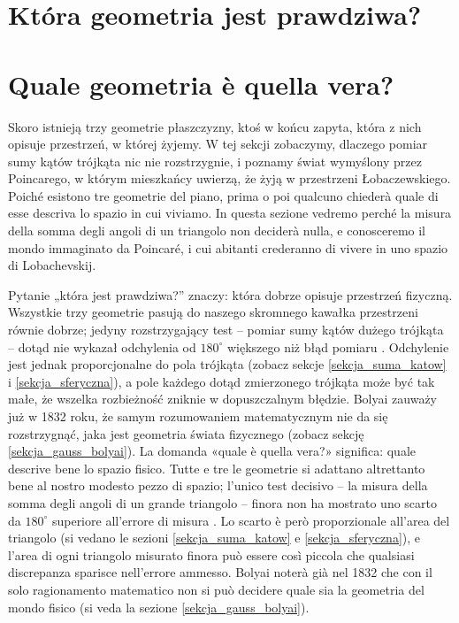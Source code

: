 
\section{Która geometria jest prawdziwa?} %
\section{Quale geometria è quella vera?} %
\label{sekcja_fizyka}

Skoro istnieją trzy geometrie płaszczyzny, ktoś w końcu zapyta, która z nich opisuje przestrzeń, w której żyjemy. %
W tej sekcji zobaczymy, dlaczego pomiar sumy kątów trójkąta nic nie rozstrzygnie, i poznamy świat wymyślony przez Poincarego, w którym mieszkańcy uwierzą, że żyją w przestrzeni Łobaczewskiego. %
Poiché esistono tre geometrie del piano, prima o poi qualcuno chiederà quale di esse descriva lo spazio in cui viviamo. %
In questa sezione vedremo perché la misura della somma degli angoli di un triangolo non deciderà nulla, e conosceremo il mondo immaginato da Poincaré, i cui abitanti crederanno di vivere in uno spazio di Lobachevskij. %

Pytanie „która jest prawdziwa?'' znaczy: która dobrze opisuje przestrzeń fizyczną. %
Wszystkie trzy geometrie pasują do naszego skromnego kawałka przestrzeni równie dobrze; jedyny rozstrzygający test -- pomiar sumy kątów dużego trójkąta -- dotąd nie wykazał odchylenia od $180^\circ$ większego niż błąd pomiaru \cite[s. 315]{eves1_1972}. %
Odchylenie jest jednak proporcjonalne do pola trójkąta (zobacz sekcje \ref{sekcja_suma_katow} i \ref{sekcja_sferyczna}), a pole każdego dotąd zmierzonego trójkąta może być tak małe, że wszelka rozbieżność zniknie w dopuszczalnym błędzie. %
Bolyai zauważy już w 1832 roku, że samym rozumowaniem matematycznym nie da się rozstrzygnąć, jaka jest geometria świata fizycznego (zobacz sekcję \ref{sekcja_gauss_bolyai}). %
La domanda «quale è quella vera?» significa: quale descrive bene lo spazio fisico. %
Tutte e tre le geometrie si adattano altrettanto bene al nostro modesto pezzo di spazio; l'unico test decisivo -- la misura della somma degli angoli di un grande triangolo -- finora non ha mostrato uno scarto da $180^\circ$ superiore all'errore di misura \cite[p. 315]{eves1_1972}. %
Lo scarto è però proporzionale all'area del triangolo (si vedano le sezioni \ref{sekcja_suma_katow} e \ref{sekcja_sferyczna}), e l'area di ogni triangolo misurato finora può essere così piccola che qualsiasi discrepanza sparisce nell'errore ammesso. %
Bolyai noterà già nel 1832 che con il solo ragionamento matematico non si può decidere quale sia la geometria del mondo fisico (si veda la sezione \ref{sekcja_gauss_bolyai}). %

